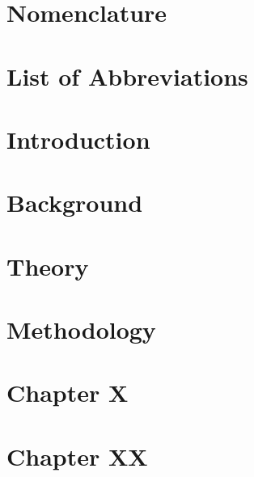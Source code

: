 \documentclass[11pt]{report}
\begin{document}
\chapter*{Nomenclature}
\label{sec:def}
\fancyhead{} %
\newpage

{} 
\chapter*{List of Abbreviations}
\label{sec:abbr}
\fancyhead{} %
\newpage

\cleardoublepage{}%
\fancyhead{} %
\fancyhead[R]{\leftmark} %

\chapter{Introduction}


\chapter{Background}


\chapter{Theory}


\chapter{Methodology}


\chapter{Chapter X}


\chapter{Chapter XX}

\end{document}
